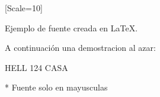 \documentclass{article}
\begin{document}
    \newfontfamily{}[Scale=10]

    Ejemplo de fuente creada en \LaTeX.

    A continuación una demostracion al azar:
    \vspace*{2cm}

    {\myfont
    HELL 124
    CASA
    }
    \vspace*{2cm}

    * Fuente solo en mayusculas
\end{document}

